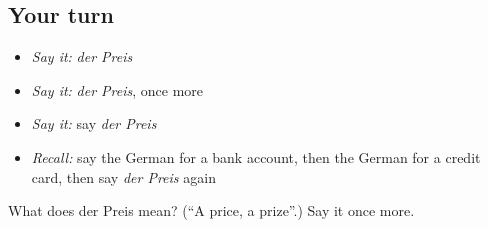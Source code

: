 \subsection*{Your turn}
\begin{itemize}
\raggedright
  \item \emph{Say it:} \emph{der Preis}
  \item \emph{Say it:} \emph{der Preis}, once more
  \item \emph{Say it:} say \emph{der Preis}
  \item \emph{Recall:} say the German for a bank account, then the German for a credit card, then say \emph{der Preis} again
\end{itemize}

\begin{tcolorbox}[breakable,colback=teal!4,colframe=teal!35!black,title={Before you move on}]
What does der Preis mean? (\textquotedblleft{}A price, a prize\textquotedblright{}.) Say it once more.
\end{tcolorbox}
